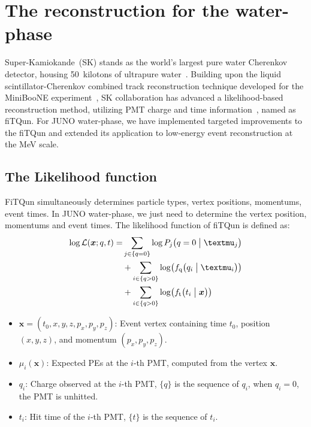 
\chapter{The reconstruction for the water-phase}
\label{chap:recon}
Super-Kamiokande~(SK) stands as the world's largest pure water Cherenkov detector, housing \SI{50}{kilotons} of ultrapure water~\cite{SK}. Building upon the liquid scintillator-Cherenkov combined track reconstruction technique developed for the MiniBooNE experiment~\cite{minibone}, SK collaboration has advanced a likelihood-based reconstruction method, utilizing PMT charge and time information~\cite{SKfiTQun}, named as fiTQun. For JUNO water-phase, we have implemented targeted improvements to the fiTQun and extended its application to low-energy event reconstruction at the \si{MeV} scale.

\section{The Likelihood function}
\label{sec:recon}
FiTQun simultaneously determines particle types, vertex positions, momentums, event times.
In JUNO water-phase, we just need to determine the vertex position, momentums and event times.
The likelihood function of fiTQun is defined as:
\begin{equation}
	\begin{aligned}
		\log \mathcal{L}(\boldsymbol{x};{q},{t}) = & \sum_{j \in \{q=0\}} \log P_j \bigl( q=0\bigm| \mu_j \bigr)                                      \\
		                                           & + \sum_{i \in \{q>0\}} \log \bigl( f_{\mathrm{q}}\bigl( q_i \bigm| \mu_i \bigr) \bigr)           \\
		                                           & + \sum_{i \in \{q>0\}} \log \bigl( f_{\mathrm{t}} \bigl( t_i \bigm| \boldsymbol{x} \bigr) \bigr)
	\end{aligned}
\end{equation}
\begin{itemize}
	\item $\boldsymbol{x} = (t_0, x, y, z, p_x, p_y, p_z)$: Event vertex containing time $t_0$, position $(x,y,z)$, and momentum $(p_x,p_y,p_z)$.
	\item $\mu_i(\boldsymbol{x})$: Expected PEs at the $i$-th PMT, computed from the vertex $\boldsymbol{x}$.
	\item $q_i$: Charge observed at the $i$-th PMT, $\{q\}$ is the sequence of $q_i$, when $q_i=0$, the PMT is unhitted.
	\item $t_i$: Hit time of the $i$-th PMT, $\{t\}$ is the sequence of $t_i$.
\end{itemize}

